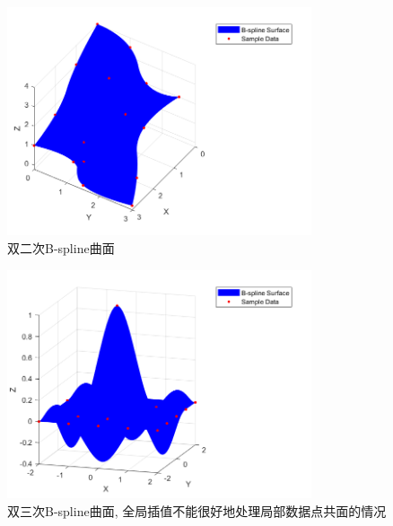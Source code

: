 \documentclass[utf8]{ctexart}
\begin{document}
\begin{itemize}
\begin{figure}[H]
        \centering
        \includegraphics[width=0.8\textwidth]{bsplineSurfInterp.png}
        \caption{双二次B-spline曲面}
        \label{fig: bsplineSurfInterp}
    \end{figure}
    \begin{figure}[H]
        \centering
        \includegraphics[width=0.8\textwidth]{bsplineSurfInterp2.png}
        \caption{双三次B-spline曲面, 全局插值不能很好地处理局部数据点共面的情况}
        \label{fig: bsplineSurfInterp2}
    \end{figure}
\end{itemize}
\end{document}

